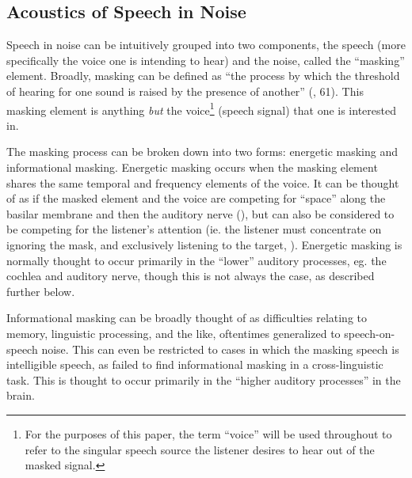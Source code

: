 \documentclass[dissertation,copyright]{uathesis}
\begin{document}
\subsection{Acoustics of Speech in Noise}
\label{bkgrnd:speech_in_noise}

Speech in noise can be intuitively grouped into two components, the speech (more specifically the voice one is intending to hear) and the noise, called the ``masking'' element.  Broadly, masking can be defined as ``the process by which the threshold of hearing for one sound is raised by the presence of another'' (\cite{ansi:13}, 61).  This masking element is anything \textit{but} the voice\footnote{For the purposes of this paper, the term ``voice'' will be used throughout to refer to the singular speech source the listener desires to hear out of the masked signal.} (speech signal) that one is interested in.

The masking process can be broken down into two forms: energetic masking and informational masking.  Energetic masking occurs when the masking element shares the same temporal and frequency elements of the voice.  It can be thought of as if the masked element and the voice are competing for ``space'' along the basilar membrane and then the auditory nerve (\cite{brungart:01}), but can also be considered to be competing for the listener's attention (ie. the listener must concentrate on ignoring the mask, and exclusively listening to the target, \cite{mattys:12}).  Energetic masking is normally thought to occur primarily in the ``lower'' auditory processes, eg. the cochlea and auditory nerve, though this is not always the case, as described further below.  

Informational masking can be broadly thought of as difficulties relating to memory, linguistic processing, and the like, oftentimes generalized to speech-on-speech noise.  This can even be restricted to cases in which the masking speech is intelligible speech, as \cite{mattys:10} failed to find informational masking in a cross-linguistic task. This is thought to occur primarily in the ``higher auditory processes'' in the brain.
\end{document}
